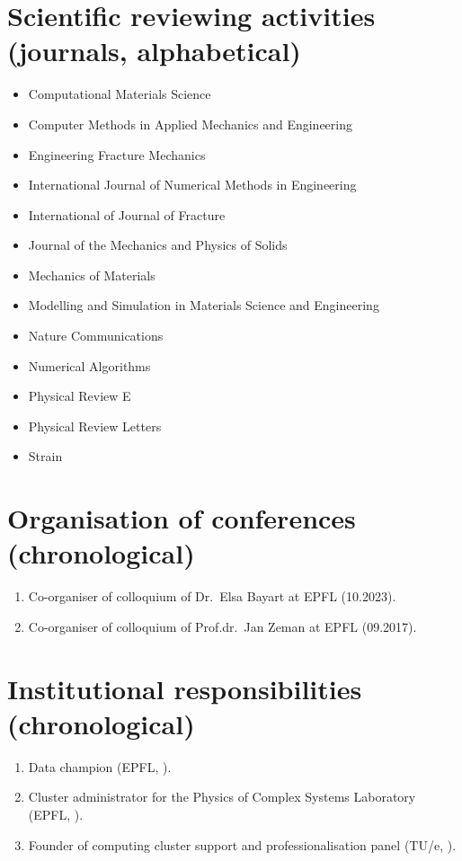 \documentclass[
    bibsize = normalsize,
    bibpackage = none,
    paragraphshape = display,
    paragraphafter = none,
]{goose-article}
\begin{document}
\section*{Scientific reviewing activities (journals, alphabetical)}

\begin{itemize}
    \item Computational Materials Science
    \item Computer Methods in Applied Mechanics and Engineering
    \item Engineering Fracture Mechanics
    \item International Journal of Numerical Methods in Engineering
    \item International of Journal of Fracture
    \item Journal of the Mechanics and Physics of Solids
    \item Mechanics of Materials
    \item Modelling and Simulation in Materials Science and Engineering
    \item Nature Communications
    \item Numerical Algorithms
    \item Physical Review E
    \item Physical Review Letters
    \item Strain
\end{itemize}

\section*{Organisation of conferences (chronological)}

\begin{enumerate}
    \item Co-organiser of colloquium of Dr.\ Elsa Bayart at EPFL (10.2023).
    \item Co-organiser of colloquium of Prof.dr.\ Jan Zeman at EPFL (09.2017).
\end{enumerate}

\section*{Institutional responsibilities (chronological)}

\begin{enumerate}
    \itemsep0em
    \item Data champion (EPFL, \MyDateDataChampion).
    \item Cluster administrator for the Physics of Complex Systems Laboratory (EPFL, \MyDateClusterEPFL).
    \item Founder of computing cluster support and professionalisation panel (TU/e, \MyDateClusterTUe).
\end{enumerate}
\end{document}
